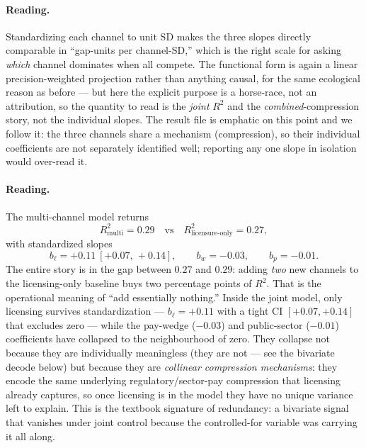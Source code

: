 \documentclass[11pt]{article}
\begin{document}
\paragraph{Reading.} Standardizing each channel to unit SD makes the three slopes directly comparable in ``gap-units per channel-SD,'' which is the right scale for asking \emph{which} channel dominates when all compete. The functional form is again a linear precision-weighted projection rather than anything causal, for the same ecological reason as before --- but here the explicit purpose is a horse-race, not an attribution, so the quantity to read is the \emph{joint} $R^2$ and the \emph{combined}-compression story, not the individual slopes. The result file is emphatic on this point and we follow it: the three channels share a mechanism (compression), so their individual coefficients are not separately identified well; reporting any one slope in isolation would over-read it.

\paragraph{Reading.} The multi-channel model returns
\[
R^2_{\text{multi}} = 0.29 \quad\text{vs}\quad R^2_{\text{licensure-only}} = 0.27,
\]
with standardized slopes
\[
b_\ell = +0.11\ [+0.07,\,+0.14], \qquad b_w = -0.03, \qquad b_p = -0.01.
\]
The entire story is in the gap between $0.27$ and $0.29$: adding \emph{two} new channels to the licensing-only baseline buys two percentage points of $R^2$. That is the operational meaning of ``add essentially nothing.'' Inside the joint model, only licensing survives standardization --- $b_\ell=+0.11$ with a tight CI $[+0.07,+0.14]$ that excludes zero --- while the pay-wedge ($-0.03$) and public-sector ($-0.01$) coefficients have collapsed to the neighbourhood of zero. They collapse not because they are individually meaningless (they are not --- see the bivariate decode below) but because they are \emph{collinear compression mechanisms}: they encode the same underlying regulatory/sector-pay compression that licensing already captures, so once licensing is in the model they have no unique variance left to explain. This is the textbook signature of redundancy: a bivariate signal that vanishes under joint control because the controlled-for variable was carrying it all along.
\end{document}
